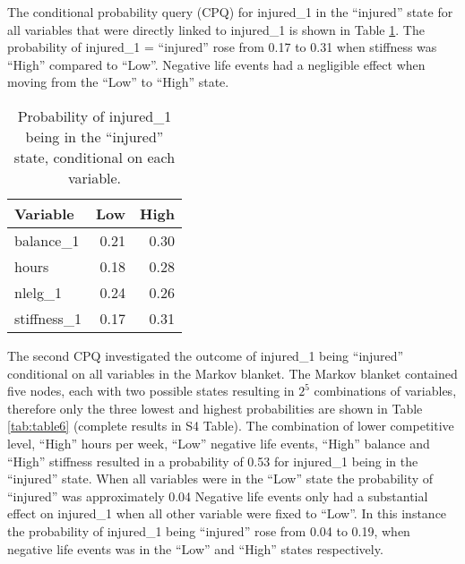 \documentclass[
  english,
  man]{apa6}
\begin{document}
The conditional probability query (CPQ) for injured\_1 in the ``injured'' state for all variables that were directly linked to injured\_1 is shown in Table \ref{tab:table5}.
The probability of injured\_1 = ``injured'' rose from 0.17 to 0.31 when stiffness was ``High'' compared to ``Low''.
Negative life events had a negligible effect when moving from the ``Low'' to ``High'' state.

\begin{table}[H]

\caption{\label{tab:table5}Probability of injured\_1 being in the ``injured'' state, conditional on each variable.}
\centering
\begin{tabular}[t]{l|r|r}
\hline
\textbf{Variable} & \textbf{Low} & \textbf{High}\\
\hline
balance\_1 & 0.21 & 0.30\\
\hline
hours & 0.18 & 0.28\\
\hline
nlelg\_1 & 0.24 & 0.26\\
\hline
stiffness\_1 & 0.17 & 0.31\\
\hline
\end{tabular}
\end{table}

The second CPQ investigated the outcome of injured\_1 being ``injured'' conditional on all variables in the Markov blanket.
The Markov blanket contained five nodes, each with two possible states resulting in \(2^5\) combinations of variables, therefore only the three lowest and highest probabilities are shown in Table \ref{tab:table6} (complete results in S4 Table).
The combination of lower competitive level, ``High'' hours per week, ``Low'' negative life events, ``High'' balance and ``High'' stiffness resulted in a probability of 0.53 for injured\_1 being in the ``injured'' state.
When all variables were in the ``Low'' state the probability of ``injured'' was approximately 0.04
Negative life events only had a substantial effect on injured\_1 when all other variable were fixed to ``Low''.
In this instance the probability of injured\_1 being ``injured'' rose from 0.04 to 0.19, when negative life events was in the ``Low'' and ``High'' states respectively.
\end{document}
